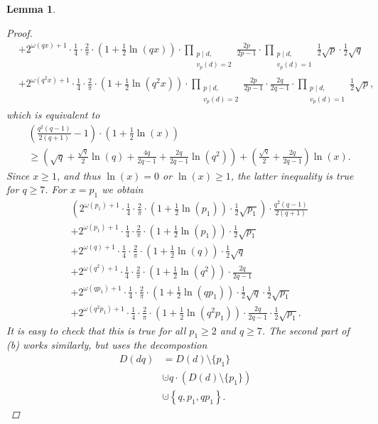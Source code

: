 \documentclass{amsart}
\newtheorem{lem}[thm]{Lemma}
\theoremstyle{definition}
\theoremstyle{remark}
\begin{document}
\begin{lem}
\begin{proof}
\begin{align*}
  & + 2^{\omega(qx)+1} \cdot \frac{1}{4} \cdot \frac{2}{\pi} 
      \cdot  \left(1+\frac{1}{2}\ln(qx)\right)
      \cdot \prod_{\substack{p \mid d,\\v_p(d)=2}}\frac{2p}{2p-1} \cdot \prod_{\substack{p \mid d,\\v_p(d)=1}}\frac{1}{2}\sqrt{p} \cdot \frac{1}{2}\sqrt{q}\\
  & + 2^{\omega(q^2x)+1} \cdot \frac{1}{4} \cdot \frac{2}{\pi} 
      \cdot  \left(1+\frac{1}{2}\ln(q^2x)\right)
      \cdot \prod_{\substack{p \mid d,\\v_p(d)=2}}\frac{2p}{2p-1} \cdot \frac{2q}{2q-1} \cdot \prod_{\substack{p \mid d,\\v_p(d)=1}}\frac{1}{2}\sqrt{p},
 \end{align*}
 which is equivalent to 
 \begin{align*}
  & \left(\frac{q^2(q-1)}{2 (q+1)}-1\right) \cdot \left(1+\frac{1}{2}\ln(x)\right) \\
  & \geq \left( \sqrt{q}+\frac{\sqrt{q}}{2} \ln(q) + \frac{4q}{2q-1}+\frac{2q}{2q-1} \ln(q^2) \right) + \left( \frac{\sqrt{q}}{2} + \frac{2q}{2q-1} \right) \ln(x).
 \end{align*}
 Since $x \geq 1$, and thus $\ln(x) = 0$ or $\ln(x) \geq 1$, the latter inequality is true for $q \ge 7$. For $x = p_1$ we obtain
  \begin{align*}
    & \left( 2^{\omega(p_1)+1} \cdot \frac{1}{4} \cdot \frac{2}{\pi} 
       \cdot  \left(1+\frac{1}{2}\ln(p_1)\right)
       \cdot \frac{1}{2}\sqrt{p_1} \right) \cdot \frac{q^2(q-1)}{2 (q+1)}  \\
   & + 2^{\omega(p_1)+1} \cdot \frac{1}{4} \cdot \frac{2}{\pi} 
       \cdot  \left(1+\frac{1}{2}\ln(p_1)\right)
       \cdot \frac{1}{2}\sqrt{p_1} \\
   & +  2^{\omega(q)+1} \cdot \frac{1}{4} \cdot \frac{2}{\pi} 
       \cdot  \left(1+\frac{1}{2}\ln(q)\right)
       \cdot \frac{1}{2}\sqrt{q} \\
   & +  2^{\omega(q^2)+1} \cdot \frac{1}{4} \cdot \frac{2}{\pi} 
       \cdot  \left(1+\frac{1}{2}\ln(q^2)\right)
       \cdot \frac{2q}{2q-1} \\
   & +  2^{\omega(qp_1)+1} \cdot \frac{1}{4} \cdot \frac{2}{\pi} 
       \cdot  \left(1+\frac{1}{2}\ln(qp_1)\right)
       \cdot \frac{1}{2}\sqrt{q} \cdot \frac{1}{2} \sqrt{p_1} \\
   & +  2^{\omega(q^2p_1)+1} \cdot \frac{1}{4} \cdot \frac{2}{\pi} 
       \cdot  \left(1+\frac{1}{2}\ln(q^2p_1)\right)
       \cdot  \frac{2q}{2q-1} \cdot \frac{1}{2}\sqrt{p_1}.
  \end{align*}
 It is easy to check that this is true for all $p_1 \geq 2$ and $q \geq 7$.
 The second part of (b) works similarly, but uses the decompostion
 \begin{align*}
    D(dq) & =  D(d) \setminus \{p_1\} \\
          & \cupdot  q \cdot \left(D(d)\setminus \{p_1\}\right) \\
          & \cupdot \left\{q, p_1, q p_1 \right\}.
 \end{align*}
 \end{proof}
\end{lem}
\end{document}
